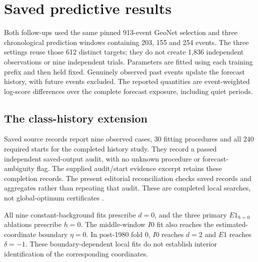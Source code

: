 \section{Saved predictive results}
\label{a2:results}

Both follow-ups used the same pinned 913-event GeoNet selection and three
chronological prediction windows containing 203, 155 and 254 events.
The three settings reuse those 612 distinct targets; they do not create
1,836 independent observations or nine independent trials. Parameters are
fitted using each training prefix and then held fixed. Genuinely observed
past events update the forecast history, with future events excluded.
The reported quantities are event-weighted log-score differences over the
complete forecast exposure, including quiet periods.

\subsection{The class-history extension}

Saved source records report nine observed cases, 30 fitting procedures
and all 240 required starts for the completed history study. They record
a passed independent saved-output audit, with no unknown procedure or
forecast-ambiguity flag. The supplied audit/start evidence excerpt retains
these completion records. The present editorial reconciliation checks
saved records and aggregates rather than repeating that audit. These are
completed local searches, not global-optimum certificates
\citep{MagnitudePredictionPilot2026}.

All nine constant-background fits prescribe \(d=0\), and the three
primary \(E1_{h=0}\) ablations prescribe \(h=0\). The middle-window
\(I0\) fit also reaches the estimated-coordinate boundary \(\eta=0\).
In post-1980 fold 0, \(I0\) reaches \(d=2\) and \(E1\) reaches
\(\delta=-1\). These boundary-dependent local fits do not establish
interior identification of the corresponding coordinates.

